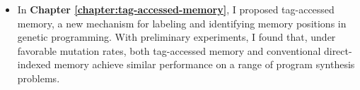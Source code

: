 \begin{itemize}
    \item In \textbf{Chapter \ref{chapter:tag-accessed-memory}}, I proposed tag-accessed memory, a new mechanism for labeling and identifying memory positions in genetic programming.  
    With preliminary experiments, I found that, under favorable mutation rates, both tag-accessed memory and conventional direct-indexed memory achieve similar performance on a range of program synthesis problems. 
    
\end{itemize}
